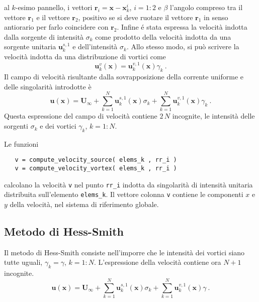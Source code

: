 al $k$-esimo pannello, i vettori $\bm{r}_i = \bm{x} - \bm{x}^i_k$, $i = 1:2$ e $\beta$ l'angolo compreso tra il vettore $\bm{r}_1$ e il vettore $\bm{r}_2$, positivo se si deve ruotare il vettore $\bm{r}_1$ in senso antiorario per farlo coincidere con $\bm{r}_2$.
Infine é stata espressa la velocità indotta dalla sorgente di intensità $\sigma_k$ come prodotto della velocità indotta da una sorgente unitaria $\bm{u}^{s,1}_k$ e dell'intensità $\sigma_k$. \newline
Allo stesso modo, si può scrivere la velocità indotta da una distribuzione di vortici come
\begin{equation}
 \bm{u}^v_k(\bm{x}) = \bm{u}^{v,1}_k(\bm{x}) \gamma_k \ .
\end{equation}
Il campo di velocità risultante dalla sovrapposizione della corrente uniforme e delle singolarità introdotte è
\begin{equation}
 \bm{u}(\bm{x}) = \bm{U}_{\infty}
  + \displaystyle\sum_{k=1}^{N}\bm{u}^{s,1}_k(\bm{x}) \sigma_k 
  + \displaystyle\sum_{k=1}^{N}\bm{u}^{v,1}_k(\bm{x}) \gamma_k \ .
\end{equation}
Questa espressione del campo di velocità contiene $2\,N$ incognite, le intensità delle sorgenti $\sigma_k$ e dei vortici $\gamma_k$, $k=1:N$.
\begin{tcolorbox}
Le funzioni
\begin{verbatim}
   v = compute_velocity_source( elems_k , rr_i )
   v = compute_velocity_vortex( elems_k , rr_i )
\end{verbatim}
calcolano la velocità \texttt{v} nel punto \texttt{rr\_i} indotta da singolarità di intensità unitaria distribuita sull'elemento \texttt{elems\_k}. Il vettore colonna  \texttt{v} contiene le componenti $x$ e $y$ della velocità, nel sistema di riferimento globale.
\end{tcolorbox}

\subsection{Metodo di Hess-Smith}
Il metodo di Hess-Smith consiste nell'imporre che le intensità dei vortici siano tutte uguali, $\gamma_k = \gamma$, $k=1:N$. L'espressione della velocità contiene ora $N+1$ incognite.
\begin{equation}
 \bm{u}(\bm{x}) = \bm{U}_{\infty}
  + \displaystyle\sum_{k=1}^{N}\bm{u}^{s,1}_k(\bm{x}) \sigma_k 
  + \displaystyle\sum_{k=1}^{N}\bm{u}^{v,1}_k(\bm{x}) \gamma \ .
\end{equation}

